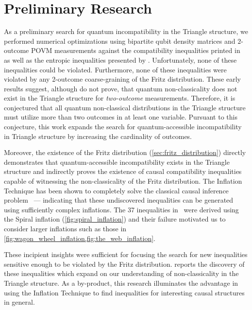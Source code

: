 \documentclass[aps, 10pt, english, twoside, pra, nofootinbib, tightenlines, longbibliography, superscriptaddress]{revtex4-1}
\begin{document}
    \section{Preliminary Research}
    \label{sec:preliminary_research}

    As a preliminary search for quantum incompatibility in the Triangle structure, we performed numerical optimizations using bipartite qubit density matrices and $2$-outcome POVM measurements against the compatibility inequalities printed in~\cite{Inflation} as well as the entropic inequalities presented by \citet{Henson_2014}. Unfortunately, none of these inequalities could be violated. Furthermore, none of these inequalities were violated by any 2-outcome coarse-graining of the Fritz distribution. These early results suggest, although do not prove, that quantum non-classicality does not exist in the Triangle structure for \textit{two-outcome} measurements. Therefore, it is conjectured that all quantum non-classical distributions in the Triangle structure must utilize more than two outcomes in at least one variable. Pursuant to this conjecture, this work expands the search for quantum-accessible incompatibility in Triangle structure by increasing the cardinality of outcomes.

    Moreover, the existence of the Fritz distribution (\cref{sec:fritz_distribution}) directly demonstrates that quantum-accessible incompatibility exists in the Triangle structure and indirectly proves the existence of causal compatibility inequalities capable of witnessing the non-classicality of the Fritz distribution. The Inflation Technique has been shown to completely solve the classical causal inference problem~\cite{Navascues_2017} --- indicating that these undiscovered inequalities can be generated using sufficiently complex inflations. The 37 inequalities in~\cite{Inflation} were derived using the Spiral inflation (\cref{fig:spiral_inflation}) and their failure motivated us to consider larger inflations such as those in \cref{fig:wagon_wheel_inflation,fig:the_web_inflation}.

    These incipient insights were sufficient for focusing the search for new inequalities sensitive enough to be violated by the Fritz distribution.  reports the discovery of these inequalities which expand on our understanding of non-classicality in the Triangle structure. As a by-product, this research illuminates the advantage in using the Inflation Technique to find inequalities for interesting causal structures in general.
\end{document}
